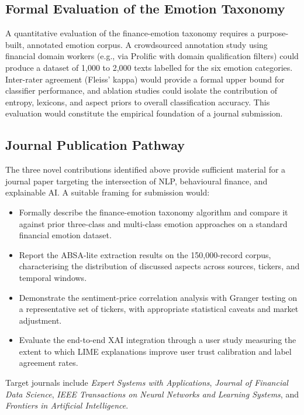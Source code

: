 \subsection{Formal Evaluation of the Emotion Taxonomy}

A quantitative evaluation of the finance-emotion taxonomy requires a purpose-built, annotated emotion corpus.  A crowdsourced annotation study using financial domain workers (e.g., via Prolific with domain qualification filters) could produce a dataset of 1,000 to 2,000 texts labelled for the six emotion categories.  Inter-rater agreement (Fleiss' kappa) would provide a formal upper bound for classifier performance, and ablation studies could isolate the contribution of entropy, lexicons, and aspect priors to overall classification accuracy.  This evaluation would constitute the empirical foundation of a journal submission.

\subsection{Journal Publication Pathway}

The three novel contributions identified above provide sufficient material for a journal paper targeting the intersection of NLP, behavioural finance, and explainable AI.  A suitable framing for submission would:

\begin{itemize}
    \item Formally describe the finance-emotion taxonomy algorithm and compare it against prior three-class and multi-class emotion approaches on a standard financial emotion dataset.
    \item Report the ABSA-lite extraction results on the 150{,}000-record corpus, characterising the distribution of discussed aspects across sources, tickers, and temporal windows.
    \item Demonstrate the sentiment-price correlation analysis with Granger testing on a representative set of tickers, with appropriate statistical caveats and market adjustment.
    \item Evaluate the end-to-end XAI integration through a user study measuring the extent to which LIME explanations improve user trust calibration and label agreement rates.
\end{itemize}

Target journals include \textit{Expert Systems with Applications}, \textit{Journal of Financial Data Science}, \textit{IEEE Transactions on Neural Networks and Learning Systems}, and \textit{Frontiers in Artificial Intelligence}.

